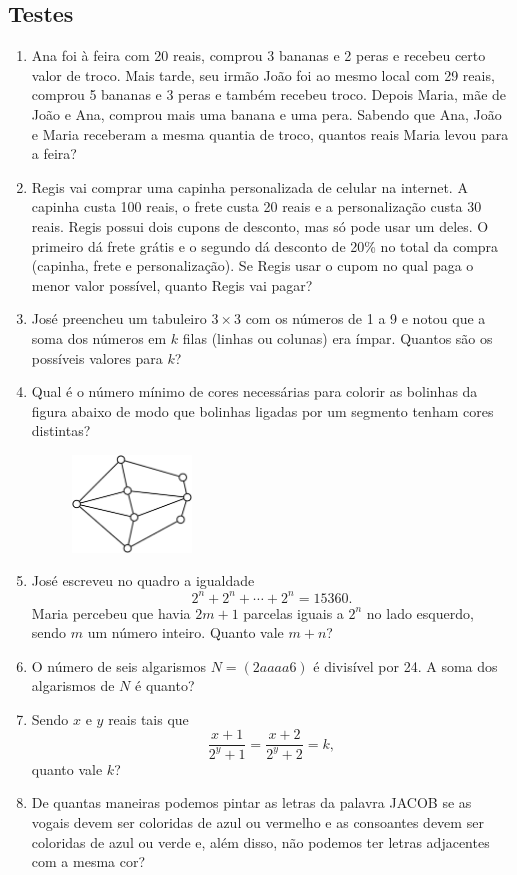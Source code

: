 \documentclass[12pt]{article}
\begin{document}
    \subsection{Testes}
      \begin{enumerate}[label=\textbf{\arabic*.}]
        \item Ana foi à feira com 20 reais, comprou 3 bananas e 2 peras e recebeu certo valor de troco. Mais tarde, seu irmão João foi ao
          mesmo local com 29 reais, comprou 5 bananas e 3 peras e também recebeu troco. Depois Maria, mãe de João e Ana, comprou mais uma
          banana e uma pera. Sabendo que Ana, João e Maria receberam a mesma quantia de troco, quantos reais Maria levou para a feira?
        \item Regis vai comprar uma capinha personalizada de celular na internet. A capinha custa 100 reais, o frete custa 20 reais e a
          personalização custa 30 reais. Regis possui dois cupons de desconto, mas só pode usar um deles. O primeiro dá frete grátis e o
          segundo dá desconto de 20\% no total da compra (capinha, frete e personalização). Se Regis usar o cupom no qual paga o menor valor
          possível, quanto Regis vai pagar?
        \item José preencheu um tabuleiro $3\times3$ com os números de 1 a 9 e notou que a soma dos números em \(k\) filas (linhas ou colunas)
          era ímpar. Quantos são os possíveis valores para \(k\)?
        \item Qual é o número mínimo de cores necessárias para colorir as bolinhas da figura abaixo de modo que bolinhas ligadas por um
          segmento tenham cores distintas?
          \begin{figure}[h]
            \centering
            \includegraphics[width=0.3\textwidth]{first.png}
          \end{figure}
        \item José escreveu no quadro a igualdade
          \[
            2^n + 2^n + \cdots + 2^n = 15360.
          \]
          Maria percebeu que havia \(2m+1\) parcelas iguais a \(2^n\) no lado esquerdo, sendo \(m\) um número inteiro. Quanto vale \(m+n\)?
        \item O número de seis algarismos \(N = (2aaaa6)\) é divisível por 24. A soma dos algarismos de \(N\) é quanto?
        \item Sendo \(x\) e \(y\) reais tais que
          \[
            \frac{x+1}{2^y+1} = \frac{x+2}{2^y+2} = k,
          \]
          quanto vale \(k\)?
        \item De quantas maneiras podemos pintar as letras da palavra JACOB se as vogais devem ser coloridas de azul ou vermelho e as
          consoantes devem ser coloridas de azul ou verde e, além disso, não podemos ter letras adjacentes com a mesma cor?


\end{enumerate}
\end{document}
